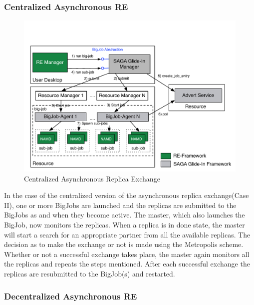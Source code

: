 \documentclass[a4paper,10pt]{article}
\begin{document}
\subsubsection{Centralized Asynchronous RE}

\begin{figure}
\centering
\includegraphics[scale=0.50]{figures/Bigjob_arch.pdf}
\caption{\small Centralized Asynchronous Replica Exchange}
\label{fig:centralized}
\end{figure}

In the case of the centralized version of the asynchronous replica exchange(Case II), one or more BigJobs are
launched and the replicas are submitted to the BigJobs as and when they become active. The master, which also launches the BigJob,
now monitors the replicas. When a replica is in done state, the master will start a search for an appropriate partner from all the available replicas. The decision as to make the exchange or not is made using the Metropolis scheme. 
Whether or not a successful exchange takes place, the master again monitors all the replicas and  repeats the steps mentioned.
After each successful exchange the replicas are resubmitted to the BigJob(s) and restarted.

\subsubsection{Decentralized Asynchronous RE}
\end{document}

